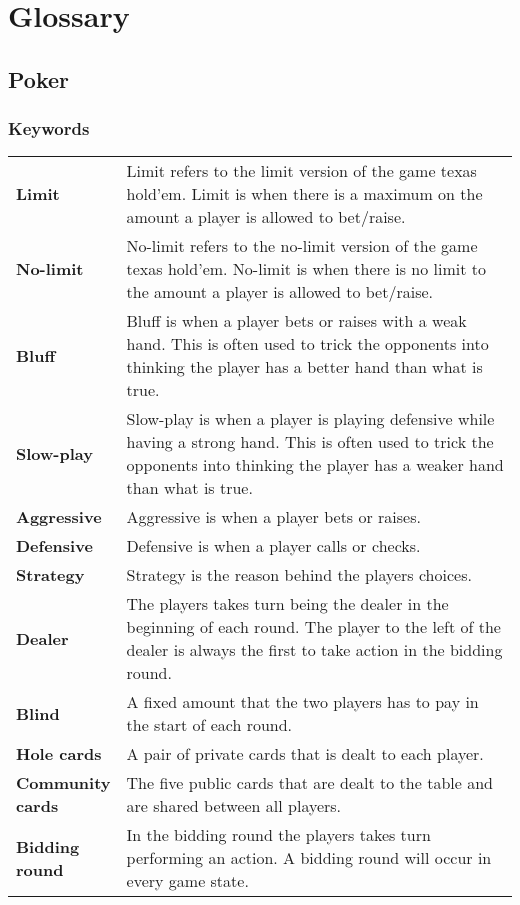 \section*{Glossary}

\subsection*{Poker}
\subsubsection*{Keywords}
\begin{tabular}{ p{0.18\linewidth} p{0.82\linewidth} }
\textbf{Limit} & Limit refers to the limit version of the game texas hold'em. Limit is when there is a maximum on the amount a player is allowed to bet/raise.\\
\textbf{No-limit} & No-limit refers to the no-limit version of the game texas hold'em. No-limit is when there is no limit to the amount a player is allowed to bet/raise.\\
\textbf{Bluff} & Bluff is when a player bets or raises with a weak hand. This is often used to trick the opponents into thinking the player has a better hand than what is true.\\  
\textbf{Slow-play} & Slow-play is when a player is playing defensive while having a strong hand. This is often used to trick the opponents into thinking the player has a weaker hand than what is true.\\
\textbf{Aggressive} & Aggressive is when a player bets or raises.\\
\textbf{Defensive} & Defensive is when a player calls or checks.\\
\textbf{Strategy} & Strategy is the reason behind the players choices.\\
\textbf{Dealer} & The players takes turn being the dealer in the beginning of each round. The player to the left of the dealer is always the first to take action in the bidding round.\\
\textbf{Blind} & A fixed amount that the two players has to pay in the start of each round.\\
\textbf{Hole cards} & A pair of private cards that is dealt to each player. \\
\textbf{Community cards} & The five public cards that are dealt to the table and are shared between all players.\\
\textbf{Bidding round} & In the bidding round the players takes turn performing an action. A bidding round will occur in every game state.\\

\end{tabular}
